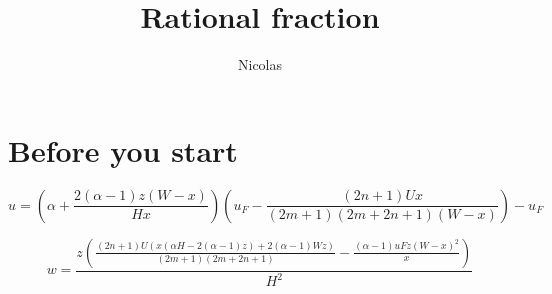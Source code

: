 \documentclass[11pt]{article}
\title{\textbf{Rational fraction}}
\author{Nicolas}
\date{}
\begin{document}
\maketitle

\section{Before you start}

\[
 u =
 \left(
 \alpha 
 +\frac{2 (\alpha -1) z (W-x)}{H x}
 \right) 
 \left(
 u_F
 -\frac{(2 n+1) U x}{(2 m+1) (2 m+2 n+1) (W-x)}
 \right)-u_F
\]

\[
 w = 
 \frac{z \left(\frac{(2 n+1) U (x (\alpha  H-2 (\alpha -1) z)+2 (\alpha -1) W z)}{(2 m+1) (2 m+2 n+1)}-\frac{(\alpha -1) uF z (W-x)^2}{x}\right)}{H^2}
 \]
\end{document}
